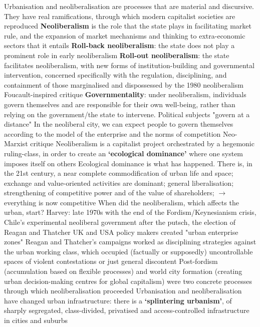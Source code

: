 \documentclass{article}
\begin{document}
\begin{outline}
	\1  Urbanisation and neoliberalisation are processes that are material and discursive. They have real ramifications, through which modern capitalist societies are reproduced
	\1\textbf{Neoliberalism} is the role that the state plays in facilitating market rule, and the expansion of market mechanisms and thinking to extra-economic sectors that it entails
		\2 \textbf{Roll-back neoliberalism}: the state does not play a prominent role in early neoliberalism
		\2 \textbf{Roll-out neoliberalism}: the state facilitates neoliberalism, with new forms of institution-building and governmental intervention, concerned specifically with the regulation, disciplining, and containment of those marginalised and dispossessed by the 1980 neoliberalism
	\1 Foucault-inspired critique
		\2 \textbf{Governmentality}: under neoliberalism, individuals govern themselves and are responsible for their own well-being, rather than relying on the government/the state to intervene. Political subjects "govern at a distance"
		\2 In the neoliberal city, we can expect people to govern themselves according to the model of the enterprise and the norms of competition 
	\1 Neo-Marxist critique
		\2 Neoliberalism is a capitalist project orchestrated by a hegemonic ruling-class, in order to create an \textbf{`ecological dominance'} where one system imposes itself on others
		\2 Ecological dominance is what has happened. There is, in the 21st century, a near complete commodification of urban life and space; exchange and value-oriented activities are dominant; general liberalisation; strengthening of competitive power and of the value of shareholders; $\rightarrow$ everything is now competitive
	\1 When did the neoliberalism, which affects the urban, start?
		\2 Harvey: late 1970s with the end of the Fordism/Keynesianism crisis, Chile's experimental neoliberal government after the putsch, the election of Reagan and Thatcher
		\2 UK and USA policy makers created "urban enterprise zones"
		\2 Reagan and Thatcher's campaigns worked as disciplining strategies against the urban working class, which occupied (factually or supposedly) uncontrollable spaces of violent contestations or just general discontent
		\2 Post-fordism (accumulation based on flexible processes) and world city formation (creating urban decision-making centres for global capitalism) were two concrete processes through which neoliberalisation proceeded
	\1 Urbanisation and neoliberalisation have changed urban infrastructure: there is a \textbf{`splintering urbanism'}, of sharply segregated, class-divided, privatised and access-controlled infrastructure in cities and suburbs

\end{outline}
\end{document}
